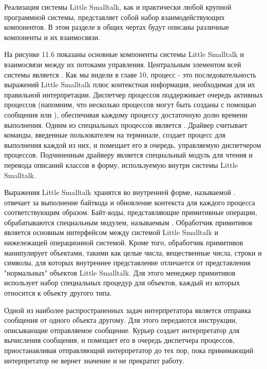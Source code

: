 
Реализация системы Little Smalltalk, как и практически любой крупной программной
системы, представляет собой набор взаимодействующих компонентов. В этом разделе
в общих чертах будут описаны различные компоненты и их взаимосвязи.

На рисунке 11.6 показаны основные компоненты системы Little Smalltalk и
взаимосвязи между их потоками управления. Центральным элементом всей системы
является . Как мы видели в главе 10, процесс - это
последовательность выражений Little Smalltalk плюс контекстная информация,
необходимая для их правильной интерпретации. Диспетчер процессов поддерживает
очередь активных процессов (напомним, что несколько процессов могут быть созданы
с помощью сообщения  или ), обеспечивая каждому
процессу достаточную долю времени выполнения. Одним из специальных процессов
является . Драйвер считывает команды, введенные пользователем на
терминале, создает процесс для выполнения каждой из них, и помещает его в
очередь, управляемую диспетчером процессов. Подчиненным драйверу является
специальный модуль для чтения и перевода описаний классов в форму, используемую
внутри системы Little Smalltalk.


Выражения Little Smalltalk хранятся во внутренней форме, называемой
.  отвечает за выполнение байткода и
обновление контекста для каждого процесса соответствующим образом. Байт-коды,
представляющие примитивные операции, обрабатываются специальным модулем,
называемым . Обработчик примитивов является основным
интерфейсом между системой Little Smalltalk и нижележащей операционной системой.
Кроме того, обработчик примитивов манипулирует объектами, такими как целые
числа, вещественные числа, строки и символы, для которых внутреннее
представление отличается от представления "нормальных" объектов Little
Smalltalk. Для этого менеджер примитивов использует набор специальных процедур
для объектов, каждый из которых относится к объекту другого типа.

Одной из наиболее распространенных задач интерпретатора является отправка
сообщения от одного объекта другому. Для этого  передаются
инструкции, описывающие отправляемое сообщение. Курьер создает интерпретатор для
вычисления сообщения, и помещает его в очередь диспетчера процессов,
приостанавливая отправляющий интерпретатор до тех пор, пока принимающий
интерпретатор не вернет значение и не прекратит работу.

